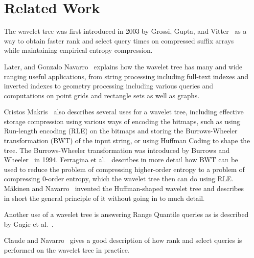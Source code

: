\section{Related Work}
The wavelet tree was first introduced in 2003 by Grossi, Gupta, and Vitter~\cite[Section 4.2]{Grossi:2003:HET:644108.644250} as a way to obtain faster rank and select query times on compressed suffix arrays while maintaining empirical entropy compression.

Later, and Gonzalo Navarro~\cite{Navjda13} explains how the wavelet tree has many and wide ranging useful applications, from string processing including full-text indexes and inverted indexes to geometry processing including various queries and computations on point grids and rectangle sets as well as graphs.

Cristos Makris~\citep{WTSurvey} also describes several uses for a wavelet tree, including effective storage compression using various ways of encoding the bitmaps, such as using Run-length encoding (RLE) on the bitmaps and storing the Burrows-Wheeler transformation (BWT) of the input string, or using Huffman Coding to shape the tree.
The Burrows-Wheeler transformation was introduced by Burrows and Wheeler~\citep{BWToriginalArticle} in 1994.
Ferragina et al.~\citep{waveletTreeEntropy} describes in more detail how BWT can be used to reduce the problem of compressing higher-order entropy to a problem of compressing 0-order entropy, which the wavelet tree then can do using RLE.
Mäkinen and Navarro~\citep[Section~4]{FMcountOnBWT} invented the Huffman-shaped wavelet tree and describes in short the general principle of it without going in to much detail.

Another use of a wavelet tree is answering Range Quantile queries as is described by Gagie et al.~\citep[Section 3]{RangeQuantileQueries}.

Claude and Navarro~\citep[Section~2.2]{Claude08practicalrankselect} gives a good description of how rank and select queries is performed on the wavelet tree in practice.